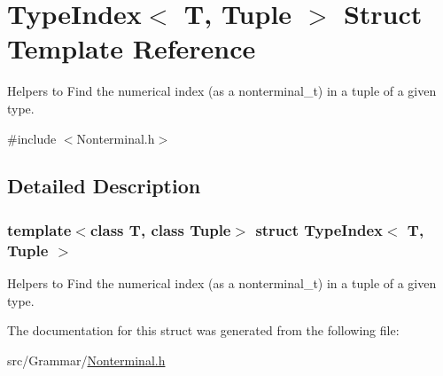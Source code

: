 \hypertarget{struct_type_index}{}\section{Type\+Index$<$ T, Tuple $>$ Struct Template Reference}
\label{struct_type_index}


Helpers to Find the numerical index (as a nonterminal\+\_\+t) in a tuple of a given type.  




{\ttfamily \#include $<$Nonterminal.\+h$>$}



\subsection{Detailed Description}
\subsubsection*{template$<$class T, class Tuple$>$\newline
struct Type\+Index$<$ T, Tuple $>$}

Helpers to Find the numerical index (as a nonterminal\+\_\+t) in a tuple of a given type. 

The documentation for this struct was generated from the following file\+:\begin{DoxyCompactItemize}
\item 
src/\+Grammar/\hyperlink{_nonterminal_8h}{Nonterminal.\+h}\end{DoxyCompactItemize}
